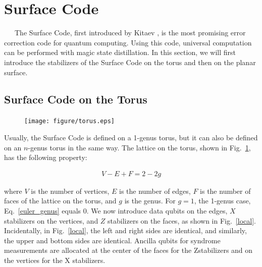 \documentclass[a4paper,11pt]{ltjsarticle}
\begin{document}
\section{Surface Code}{
    \ \ \ The Surface Code, first introduced by Kitaev \cite{kitaev1997}, is the most promising error correction code for quantum computing. Using this code, universal computation can be performed with magic state distillation. In this section, we will first introduce the stabilizers of the Surface Code on the torus and then on the planar surface.

    \subsection{Surface Code on the Torus}{

        \begin{figure}[h]
            \centering
            \texttt{[image: figure/torus.eps]}
            \vspace{0pt}\caption{}
            \label{torus}
            \vspace{-15pt}
        \end{figure}

        Usually, the Surface Code is defined on a 1-genus torus, but it can also be defined on an $n$-genus torus in the same way. The lattice on the torus, shown in Fig.~\ref{torus}, has the following property:

        \begin{align}\label{euler_genus}
            V-E+F=2-2g
        \end{align}
        
        where $V$ is the number of vertices, $E$ is the number of edges, $F$ is the number of faces of the lattice on the torus, and $g$ is the genus. For $g = 1$, the 1-genus case, Eq.~\ref{euler_genus} equals $0$. We now introduce data qubits on the edges, $X$ stabilizers on the vertices, and $Z$ stabilizers on the faces, as shown in Fig.~\ref{local}. Incidentally, in Fig.~\ref{local}, the left and right sides are identical, and similarly, the upper and bottom sides are identical. Ancilla qubits for syndrome measurements are allocated at the center of the faces for the Zstabilizers and on the vertices for the X stabilizers.

}}
\end{document}
